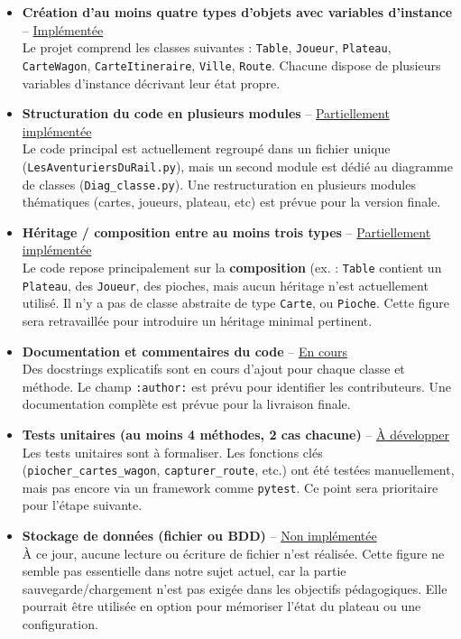 \documentclass[a4paper,12pt]{report}
\begin{document}
\begin{itemize}
    \item \textbf{Création d’au moins quatre types d’objets avec variables d’instance} – \underline{Implémentée} \\
    Le projet comprend les classes suivantes : \texttt{Table}, \texttt{Joueur}, \texttt{Plateau}, \texttt{CarteWagon},
    \texttt{CarteItineraire}, \texttt{Ville}, \texttt{Route}.
    Chacune dispose de plusieurs variables d’instance décrivant leur état propre.

    \item \textbf{Structuration du code en plusieurs modules} – \underline{Partiellement implémentée} \\
    Le code principal est actuellement regroupé dans un fichier unique
    (\texttt{LesAventuriersDuRail.py}), mais un second module est dédié au diagramme de classes (\texttt{Diag\_classe.py}).
    Une restructuration en plusieurs modules thématiques (cartes, joueurs, plateau, etc) est prévue pour la version finale.

    \item \textbf{Héritage / composition entre au moins trois types} – \underline{Partiellement implémentée} \\
    Le code repose principalement sur la \textbf{composition}
    (ex. : \texttt{Table} contient un \texttt{Plateau}, des \texttt{Joueur}, des pioches, mais aucun héritage n'est actuellement utilisé.
    Il n’y a pas de classe abstraite de type \texttt{Carte}, ou \texttt{Pioche}.
    Cette figure sera retravaillée pour introduire un héritage minimal pertinent.

    \item \textbf{Documentation et commentaires du code} – \underline{En cours} \\
    Des docstrings explicatifs sont en cours d’ajout pour chaque classe et méthode.
    Le champ \texttt{:author:} est prévu pour identifier les contributeurs.
    Une documentation complète est prévue pour la livraison finale.

    \item \textbf{Tests unitaires (au moins 4 méthodes, 2 cas chacune)} – \underline{À développer} \\
    Les tests unitaires sont à formaliser.
    Les fonctions clés (\texttt{piocher\_cartes\_wagon}, \texttt{capturer\_route}, etc.) ont été testées manuellement,
    mais pas encore via un framework comme \texttt{pytest}.
    Ce point sera prioritaire pour l’étape suivante.

    \item \textbf{Stockage de données (fichier ou BDD)} – \underline{Non implémentée} \\
    À ce jour, aucune lecture ou écriture de fichier n’est réalisée.
    Cette figure ne semble pas essentielle dans notre sujet actuel, car la partie sauvegarde/chargement n’est pas exigée dans les objectifs pédagogiques.
    Elle pourrait être utilisée en option pour mémoriser l’état du plateau ou une configuration.

\end{itemize}
\end{document}
